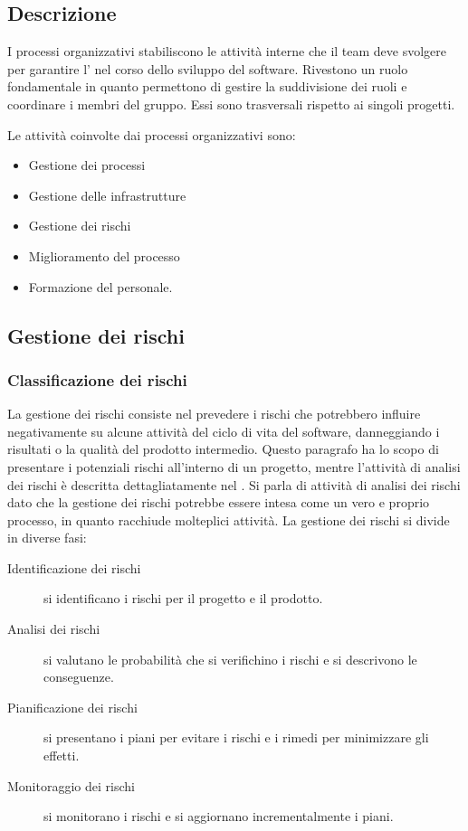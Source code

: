 \documentclass[../norme-di-progetto.tex]{subfiles}
\begin{document}
\subsection{Descrizione}%
\label{sub:processi_organizzativi/descrizione}

I processi organizzativi stabiliscono le attività interne che il team deve svolgere per garantire l' nel corso dello sviluppo del software.
Rivestono un ruolo fondamentale in quanto permettono di gestire la suddivisione dei ruoli e coordinare i membri del gruppo.
Essi sono trasversali rispetto ai singoli progetti.

Le attività coinvolte dai processi organizzativi sono:

\begin{itemize}
  \item Gestione dei processi
  \item Gestione delle infrastrutture
  \item Gestione dei rischi
  \item Miglioramento del processo
  \item Formazione del personale.
\end{itemize}

\subsection{Gestione dei rischi}%
\label{sub:gestione_dei_rischi}

\subsubsection{Classificazione dei rischi}%
\label{subs:classificazione_dei_rischi}
La gestione dei rischi consiste nel prevedere i rischi che potrebbero influire negativamente su alcune attività del ciclo di vita del software, danneggiando i risultati o la qualità del prodotto intermedio.
Questo paragrafo ha lo scopo di presentare i potenziali rischi all'interno di un progetto, mentre l'attività di analisi dei rischi è descritta dettagliatamente nel .
Si parla di attività di analisi dei rischi dato che la gestione dei rischi potrebbe essere intesa come un vero e proprio processo, in quanto racchiude molteplici attività. La gestione dei rischi si divide in diverse fasi:

\begin{description}
  \item [Identificazione dei rischi] si identificano i rischi per il progetto e il prodotto.
  \item [Analisi dei rischi] si valutano le probabilità che si verifichino i rischi e si descrivono le conseguenze.
  \item [Pianificazione dei rischi] si presentano i piani per evitare i rischi e i rimedi per minimizzare gli effetti.
  \item [Monitoraggio dei rischi] si monitorano i rischi e si aggiornano incrementalmente i piani.
\end{description}
\end{document}
